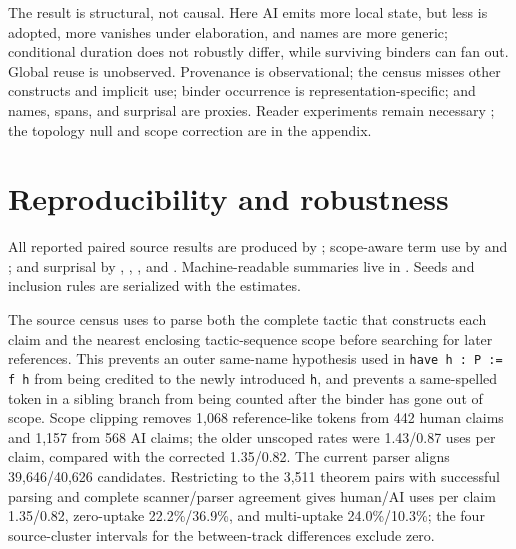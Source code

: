 \documentclass[10pt]{article}
\newcommand{\code}[1]{\texttt{#1}}
\begin{document}
The result is structural, not causal.  Here AI emits more local state, but less is adopted, more
vanishes under elaboration, and names are more generic; conditional duration does not robustly
differ, while surviving binders can fan out.  Global reuse is unobserved.  Provenance is
observational; the census misses other constructs and implicit use; binder occurrence is
representation-specific; and names, spans, and surprisal are proxies.  Reader experiments remain
necessary \citep{kambhamettu2026}; the topology null and scope correction are in the appendix.

\clearpage



\appendix
\clearpage
\small
\section{Reproducibility and robustness}

All reported paired source results are produced by ; scope-aware term
use by  and ; and surprisal by
, ,
, and .  Machine-readable summaries live in .
Seeds and inclusion rules are serialized with the estimates.

The source census uses  to parse both the complete tactic that
constructs each claim and the nearest enclosing tactic-sequence scope before searching for later
references.  This prevents an outer same-name hypothesis used in \code{have h : P := f h} from
being credited to the newly introduced \code{h}, and prevents a same-spelled token in a sibling
branch from being counted after the binder has gone out of scope.  Scope clipping removes 1,068
reference-like tokens from 442 human claims and 1,157 from 568 AI claims; the older unscoped rates
were 1.43/0.87 uses per claim, compared with the corrected 1.35/0.82.
The current parser aligns 39,646/40,626 candidates.  Restricting to the 3,511 theorem pairs with
successful parsing and complete scanner/parser agreement gives human/AI uses per claim
1.35/0.82, zero-uptake 22.2\%/36.9\%, and multi-uptake 24.0\%/10.3\%; the four source-cluster
intervals for the between-track differences exclude zero.
\end{document}
